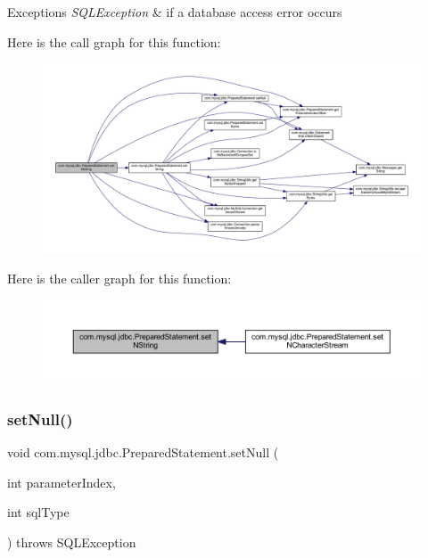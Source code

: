 \begin{DoxyExceptions}{Exceptions}
{\em S\+Q\+L\+Exception} & if a database access error occurs \\
\hline
\end{DoxyExceptions}
Here is the call graph for this function\+:
\nopagebreak
\begin{figure}[H]
\begin{center}
\leavevmode
\includegraphics[width=350pt]{classcom_1_1mysql_1_1jdbc_1_1_prepared_statement_a8a013584b26bbffe4b3c11c283ef6efc_cgraph}
\end{center}
\end{figure}
Here is the caller graph for this function\+:
\nopagebreak
\begin{figure}[H]
\begin{center}
\leavevmode
\includegraphics[width=350pt]{classcom_1_1mysql_1_1jdbc_1_1_prepared_statement_a8a013584b26bbffe4b3c11c283ef6efc_icgraph}
\end{center}
\end{figure}
\mbox{\label{classcom_1_1mysql_1_1jdbc_1_1_prepared_statement_ab885f67afaf798c888f537898f82809e}} 
\subsubsection{\texorpdfstring{set\+Null()}{setNull()}\hspace{0.1cm}{\footnotesize\ttfamily [1/2]}}
{\footnotesize\ttfamily void com.\+mysql.\+jdbc.\+Prepared\+Statement.\+set\+Null (\begin{DoxyParamCaption}\item[{int}]{parameter\+Index,  }\item[{int}]{sql\+Type }\end{DoxyParamCaption}) throws S\+Q\+L\+Exception}

